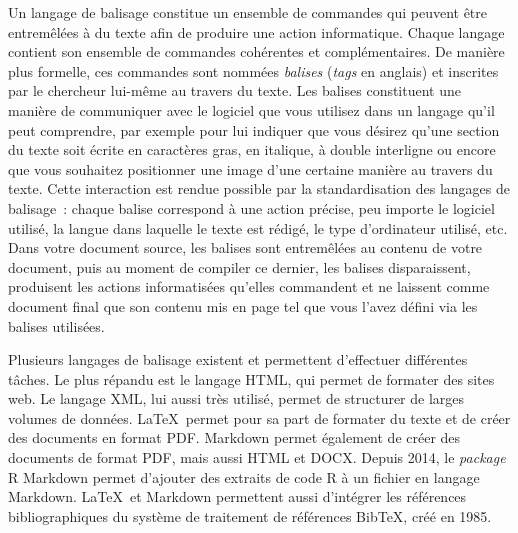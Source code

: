 \documentclass[
  letterpaper,
  DIV=11,
  numbers=noendperiod]{scrreprt}
\begin{document}
Un langage de balisage constitue un ensemble de commandes qui peuvent
être entremêlées à du texte afin de produire une action informatique.
Chaque langage contient son ensemble de commandes cohérentes et
complémentaires. De manière plus formelle, ces commandes sont nommées
\emph{balises} (\emph{tags} en anglais) et inscrites par le chercheur
lui-même au travers du texte. Les balises constituent une manière de
communiquer avec le logiciel que vous utilisez dans un langage qu'il
peut comprendre, par exemple pour lui indiquer que vous désirez qu'une
section du texte soit écrite en caractères gras, en italique, à double
interligne ou encore que vous souhaitez positionner une image d'une
certaine manière au travers du texte. Cette interaction est rendue
possible par la standardisation des langages de balisage~: chaque balise
correspond à une action précise, peu importe le logiciel utilisé, la
langue dans laquelle le texte est rédigé, le type d'ordinateur utilisé,
etc. Dans votre document source, les balises sont entremêlées au contenu
de votre document, puis au moment de compiler ce dernier, les balises
disparaissent, produisent les actions informatisées qu'elles commandent
et ne laissent comme document final que son contenu mis en page tel que
vous l'avez défini via les balises utilisées.

Plusieurs langages de balisage existent et permettent d'effectuer
différentes tâches. Le plus répandu est le langage HTML, qui permet de
formater des sites web. Le langage XML, lui aussi très utilisé, permet
de structurer de larges volumes de données. \LaTeX~permet pour sa part
de formater du texte et de créer des documents en format PDF. Markdown
permet également de créer des documents de format PDF, mais aussi HTML
et DOCX. Depuis 2014, le \emph{package} R Markdown permet d'ajouter des
extraits de code R à un fichier en langage Markdown. \LaTeX~et Markdown
permettent aussi d'intégrer les références bibliographiques du système
de traitement de références BibTeX, créé en 1985.
\end{document}
